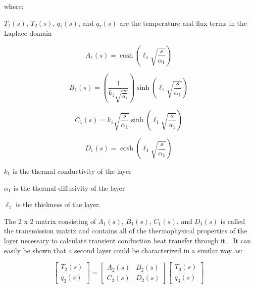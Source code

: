 where:

\(T_1(s)\), \(T_2(s)\), \(q_1(s)\), and \(q_2(s)\) are the temperature and flux terms in the Laplace domain

\begin{equation}
{A_1}\left( s \right) = \cosh \left( {{\ell_1}\sqrt {{\frac{s}{{\alpha_1}}}} } \right)
\end{equation}

\begin{equation}
{B_1}\left( s \right) = \left( {{\frac{1}{{k_1}\sqrt {{\frac{s}{{\alpha_1}}}} }}} \right)\sinh \left( {{\ell_1}\sqrt {{\frac{s}{{\alpha_1}}}} } \right)
\end{equation}

\begin{equation}
{C_1}\left( s \right) = {k_1}\sqrt {{\frac{s}{{\alpha_1}}}} \sinh \left( {{\ell_1}\sqrt {{\frac{s}{{\alpha_1}}}} } \right)
\end{equation}

\begin{equation}
{D_1}\left( s \right) = \cosh \left( {{\ell_1}\sqrt {{\frac{s}{{\alpha_1}}}} } \right)
\end{equation}

\(k_1\) is the thermal conductivity of the layer

\(\alpha_1\) is the thermal diffusivity of the layer

\({\ell_1}\) is the thickness of the layer.

The 2 x 2 matrix consisting of \(A_1(s)\), \(B_1(s)\), \(C_1(s)\), and \(D_1(s)\) is called the transmission matrix and contains all of the thermophysical properties of the layer necessary to calculate transient conduction heat transfer through it.~ It can easily be shown that a second layer could be characterized in a similar way as:

\begin{equation}
\left[ {\begin{array}{ccc}{{T_2}\left( s \right)}\\ {{q_2}\left( s \right)}\end{array}} \right] = \left[ {\begin{array}{ccc}{{A_2}\left( s \right)}&{{B_2}\left( s \right)}\\ {{C_2}\left( s \right)}&{{D_2}\left( s \right)}\end{array}} \right]\left[ {\begin{array}{ccc}{{T_3}\left( s \right)}\\ {{q_3}\left( s \right)}\end{array}} \right]
\end{equation}


